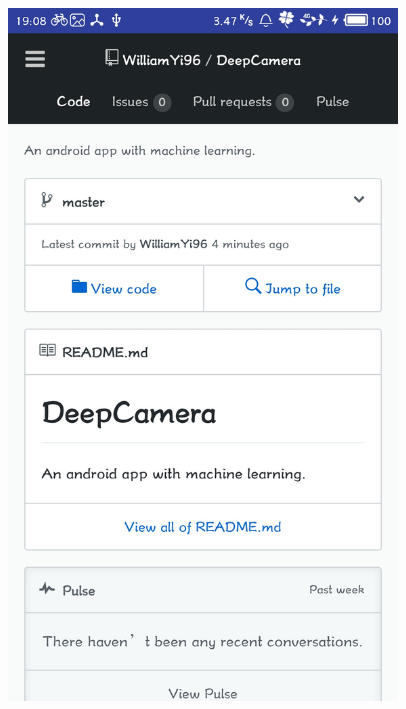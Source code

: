 \documentclass[UTF8, Microsoft YaHei]{book}
\begin{document}
\begin{figure}[!htb]
\begin{minipage}[c]{0.33\textwidth}
    \includegraphics[width=0.92\textwidth]{img/project.png}
    \end{minipage}
    \begin{minipage}[c]{0.33\textwidth}
    \centering

\end{minipage}
\end{figure}
\end{document}
